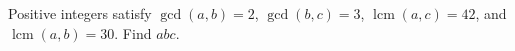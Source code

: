 Positive integers satisfy $\gcd(a,b)=2$, $\gcd(b,c)=3$, $\operatorname{lcm}(a,c)=42$, and $\operatorname{lcm}(a,b)=30$. Find $abc$.
